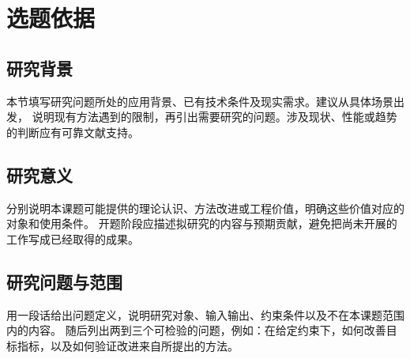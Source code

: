 \chapter{选题依据}
\label{chap:background}

\section{研究背景}
本节填写研究问题所处的应用背景、已有技术条件及现实需求。建议从具体场景出发，
说明现有方法遇到的限制，再引出需要研究的问题。涉及现状、性能或趋势的判断应有可靠文献支持。

\section{研究意义}
分别说明本课题可能提供的理论认识、方法改进或工程价值，明确这些价值对应的对象和使用条件。
开题阶段应描述拟研究的内容与预期贡献，避免把尚未开展的工作写成已经取得的成果。

\section{研究问题与范围}
用一段话给出问题定义，说明研究对象、输入输出、约束条件以及不在本课题范围内的内容。
随后列出两到三个可检验的问题，例如：在给定约束下，如何改善目标指标，以及如何验证改进来自所提出的方法。

